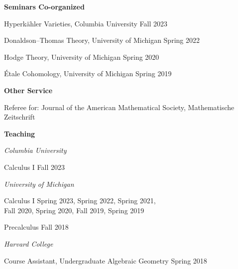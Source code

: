 \documentclass[11 pt]{letter}
\begin{document}
	
	\medskip
	\noindent
	\textbf{\large{Seminars Co-organized}}

	Hyperk\"ahler Varieties, Columbia University \hfill Fall 2023

	Donaldson--Thomas Theory, University of Michigan \hfill Spring 2022

	Hodge Theory, University of Michigan \hfill Spring 2020

	\'Etale Cohomology, University of Michigan \hfill Spring 2019 

	

	\medskip
	\noindent
	\textbf{Other Service}

	Referee for: Journal of the American Mathematical Society, Mathematische Zeitschrift


	\medskip
	\noindent
	\textbf{\large{Teaching}}

	\noindent \emph{Columbia University}

	Calculus I \hfill Fall 2023


	\noindent \emph{University of Michigan}


	

	Calculus I \hfill Spring 2023, Spring 2022, Spring 2021, \\ 
	\null \hfill Fall 2020, Spring 2020, Fall 2019, Spring 2019



	Precalculus \hfill Fall 2018 


	\noindent \emph{Harvard College}

	Course Assistant, Undergraduate Algebraic Geometry \hfill Spring 2018



	









	

\end{document}

